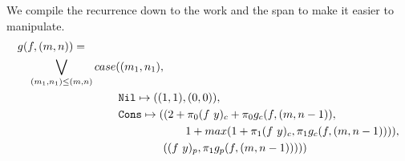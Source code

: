 %
%
We compile the recurrence down to the work and the span to make it easier to
manipulate.
%
\begin{equation*}
  \begin{split}
  &g(f, (m, n)) = \\
  &\quad \bigvee\limits_{(m_1, n_1) \leq (m, n)} case((m_1, n_1), \\
  &\qquad\quad\quad\quad\qquad\quad\quad \texttt{Nil} \mapsto ((1, 1), (0, 0)), \\
  &\qquad\quad\quad\quad\qquad\quad\quad \texttt{Cons} \mapsto ((2 + \pi_0(f\ y)_c + \pi_0 g_c(f, (m, n-1)), \\
  &\qquad\quad\quad\quad\qquad\quad\quad\quad\qquad\quad\quad\quad                     1 + max(1 + \pi_1(f\ y)_c, \pi_1 g_c(f, (m, n-1)))), \\
  &\qquad\quad\quad\quad\qquad\quad\quad\quad\quad\quad\quad                  ((f\ y)_p, \pi_1 g_p(f, (m, n-1)))))
  \end{split}
\end{equation*}
